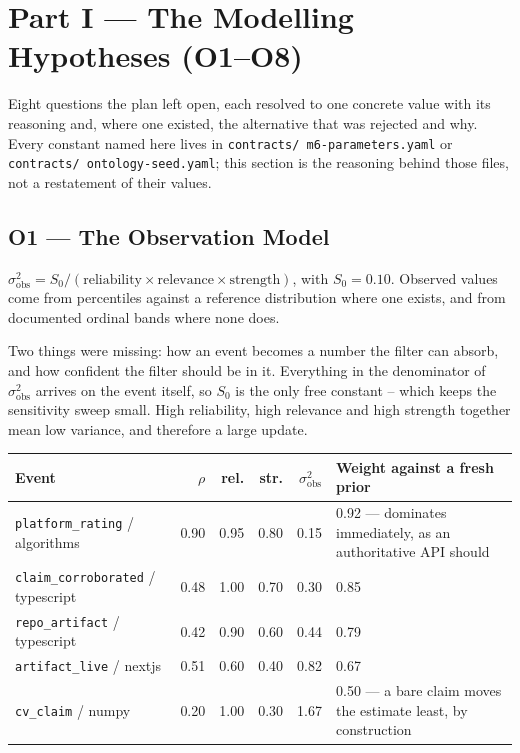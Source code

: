 \documentclass[10pt,a4paper]{article}
\newenvironment{decidedbox}[1]{%
  \def\FrameCommand{{\color{accent}\vrule width 2.4pt}\hspace{9pt}}%
  \MakeFramed{\advance\hsize-\width \FrameRestore}%
  \noindent{\sffamily\footnotesize\bfseries\color{accent}DECIDED --- #1}\par\smallskip
  \small
}{%
  \par\endMakeFramed
}
\begin{document}
\section{Part I --- The Modelling Hypotheses (O1--O8)}

Eight questions the plan left open, each resolved to one concrete value with
its reasoning and, where one existed, the alternative that was rejected and
why. Every constant named here lives in \texttt{contracts/\allowbreak
m6-\allowbreak parameters.yaml} or \texttt{contracts/\allowbreak
ontology-\allowbreak seed.yaml}; this section is the reasoning behind those
files, not a restatement of their values.

\subsection{O1 --- The Observation Model}

\begin{decidedbox}{}
$\sigma^2_{\mathrm{obs}} = S_0 / (\text{reliability} \times \text{relevance}
\times \text{strength})$, with $S_0 = 0.10$. Observed values come from
percentiles against a reference distribution where one exists, and from
documented ordinal bands where none does.
\end{decidedbox}

Two things were missing: how an event becomes a number the filter can
absorb, and how confident the filter should be in it. Everything in the
denominator of $\sigma^2_{\mathrm{obs}}$ arrives on the event itself, so
$S_0$ is the only free constant -- which keeps the sensitivity sweep small.
High reliability, high relevance and high strength together mean low
variance, and therefore a large update.

\begin{center}
\small
\begin{tabular}{@{}L{4.4cm}rrrrL{4.4cm}@{}}
\toprule
\textbf{Event} & $\rho$ & rel. & str. & $\sigma^2_{\mathrm{obs}}$ & \textbf{Weight against a fresh prior} \\
\midrule
\texttt{platform\_rating} / algorithms   & 0.90 & 0.95 & 0.80 & 0.15 & 0.92 --- dominates immediately, as an authoritative API should \\
\texttt{claim\_corroborated} / typescript & 0.48 & 1.00 & 0.70 & 0.30 & 0.85 \\
\texttt{repo\_artifact} / typescript      & 0.42 & 0.90 & 0.60 & 0.44 & 0.79 \\
\texttt{artifact\_live} / nextjs          & 0.51 & 0.60 & 0.40 & 0.82 & 0.67 \\
\texttt{cv\_claim} / numpy                & 0.20 & 1.00 & 0.30 & 1.67 & 0.50 --- a bare claim moves the estimate least, by construction \\
\bottomrule
\end{tabular}
\end{center}
\end{document}
